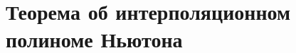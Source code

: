 \documentclass[__main__.tex]{subfiles}
\begin{document}
\section{Теорема об интерполяционном полиноме Ньютона}
\end{document}
